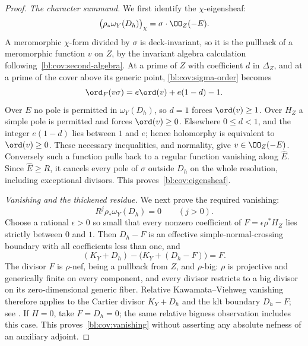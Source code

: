 \begin{proof}
\emph{The character summand.}
We first identify the $\chi$-eigensheaf:
\begin{equation}\label{bl:cov:eigensheaf}
 \bigl(\rho_*\omega_Y(D_h)\bigr)_\chi
   =\sigma\cdot\OO_Z(-E).
\end{equation}
A meromorphic $\chi$-form divided by $\sigma$ is deck-invariant, so it
is the pullback of a meromorphic function $v$ on $Z$, by the invariant
algebra calculation following~\eqref{bl:cov:second-algebra}.  At a prime
of $Z$ with coefficient $d$ in $\Delta_Z$, and at a prime of the cover
above its generic point, \eqref{bl:cov:sigma-order} becomes
\[
 \ord_F(v\sigma)=e\ord(v)+e(1-d)-1.
\]
Over $E$ no pole is permitted in $\omega_Y(D_h)$, so $d=1$ forces
$\ord(v)\geq1$.  Over $H_Z$ a simple pole is permitted and forces
$\ord(v)\geq0$.  Elsewhere $0\leq d<1$, and the integer
$e(1-d)$ lies between $1$ and $e$; hence holomorphy is equivalent
to $\ord(v)\geq0$.  These necessary inequalities, and normality,
give $v\in\OO_Z(-E)$.  Conversely such a function pulls back to a
regular function vanishing along $\widehat E$.  Since
$\widehat E\geq R$, it cancels every pole of $\sigma$ outside $D_h$
on the whole resolution, including exceptional divisors.  This
proves~\eqref{bl:cov:eigensheaf}.

\smallskip\noindent
\emph{Vanishing and the thickened residue.}
We next prove the required vanishing:
\begin{equation}\label{bl:cov:vanishing}
 R^j\rho_*\omega_Y(D_h)=0\qquad(j>0).
\end{equation}
Choose a rational $\epsilon>0$ so small that every nonzero coefficient
of $F=\epsilon\rho^*H_Z$ lies strictly between $0$ and $1$.
Then $D_h-F$ is an effective simple-normal-crossing boundary with
all coefficients less than one, and
\[
 (K_Y+D_h)-\bigl(K_Y+(D_h-F)\bigr)=F.
\]
The divisor $F$ is $\rho$-nef, being a pullback from $Z$, and
$\rho$-big: $\rho$ is projective and generically finite on every
component, and every divisor restricts to a big divisor on its
zero-dimensional generic fiber.  Relative Kawamata--Viehweg vanishing
therefore applies to the Cartier divisor $K_Y+D_h$ and the klt
boundary $D_h-F$; see \cite[Theorem~3.3]{FujinoVanishing}.
If $H=0$, take $F=D_h=0$; the same relative bigness observation
includes this case.  This proves~\eqref{bl:cov:vanishing} without
asserting any absolute nefness of an auxiliary adjoint.


\end{proof}
